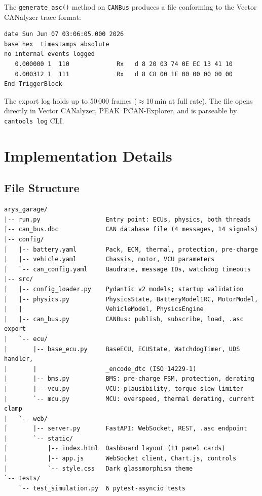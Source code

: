 \documentclass[12pt, a4paper, openany]{report}
\newcommand{\code}[1]{\texttt{#1}}
\begin{document}
The \code{generate\_asc()} method on \code{CANBus} produces a file
conforming to the Vector CANalyzer trace format:

\begin{lstlisting}[style=shell]
date Sun Jun 07 03:06:05.000 2026
base hex  timestamps absolute
no internal events logged
   0.000000 1  110             Rx   d 8 20 03 74 0E EC 13 41 10
   0.000312 1  111             Rx   d 8 C8 00 1E 00 00 00 00 00
End TriggerBlock
\end{lstlisting}

The export log holds up to 50\,000 frames ($\approx$10\,min at full rate).
The file opens directly in Vector CANalyzer, PEAK~PCAN-Explorer, and is
parseable by \code{cantools log} CLI.

\chapter{Implementation Details}

\section{File Structure}

\begin{lstlisting}[style=shell]
arys_garage/
|-- run.py                  Entry point: ECUs, physics, both threads
|-- can_bus.dbc             CAN database file (4 messages, 14 signals)
|-- config/
|   |-- battery.yaml        Pack, ECM, thermal, protection, pre-charge
|   |-- vehicle.yaml        Chassis, motor, VCU parameters
|   `-- can_config.yaml     Baudrate, message IDs, watchdog timeouts
|-- src/
|   |-- config_loader.py    Pydantic v2 models; startup validation
|   |-- physics.py          PhysicsState, BatteryModel1RC, MotorModel,
|   |                       VehicleModel, PhysicsEngine
|   |-- can_bus.py          CANBus: publish, subscribe, load, .asc export
|   `-- ecu/
|       |-- base_ecu.py     BaseECU, ECUState, WatchdogTimer, UDS handler,
|       |                   _encode_dtc (ISO 14229-1)
|       |-- bms.py          BMS: pre-charge FSM, protection, derating
|       |-- vcu.py          VCU: plausibility, torque slew limiter
|       `-- mcu.py          MCU: overspeed, thermal derating, current clamp
|   `-- web/
|       |-- server.py       FastAPI: WebSocket, REST, .asc endpoint
|       `-- static/
|           |-- index.html  Dashboard layout (11 panel cards)
|           |-- app.js      WebSocket client, Chart.js, controls
|           `-- style.css   Dark glassmorphism theme
`-- tests/
    `-- test_simulation.py  6 pytest-asyncio tests
\end{lstlisting}
\end{document}
